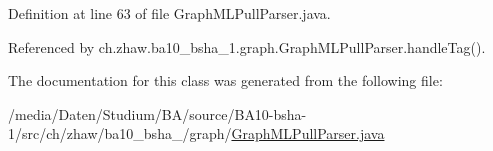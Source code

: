 Definition at line 63 of file GraphMLPullParser.java.

Referenced by ch.zhaw.ba10\_\-bsha\_\-1.graph.GraphMLPullParser.handleTag().

The documentation for this class was generated from the following file:\begin{DoxyCompactItemize}
\item 
/media/Daten/Studium/BA/source/BA10-\/bsha-\/1/src/ch/zhaw/ba10\_\-bsha\_/graph/\hyperlink{GraphMLPullParser_8java}{GraphMLPullParser.java}\end{DoxyCompactItemize}
